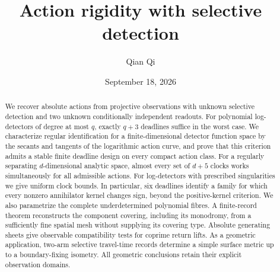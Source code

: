 \documentclass[11pt,reqno]{amsart}
\title[Action rigidity with selective detection]{Action rigidity with selective detection}
\author{Qian Qi}
\date{September 18, 2026}
\numberwithin{equation}{section}
\theoremstyle{definition}\newtheorem{definition}[theorem]{Definition}
\theoremstyle{remark}\newtheorem{remark}[theorem]{Remark}
\begin{document}
\begin{abstract}
We recover absolute actions from projective observations with unknown
selective detection and two unknown conditionally independent readouts.
For polynomial log-detectors of degree at most $q$, exactly $q+3$
deadlines suffice in the worst case. We characterize regular identification
for a finite-dimensional detector function space by the secants and
tangents of the logarithmic action curve, and prove that this criterion
admits a stable finite deadline design on every compact action class.
For a regularly separating $d$-dimensional analytic space, almost every
set of $d+5$ clocks works simultaneously for all admissible actions.
For log-detectors with prescribed singularities we give uniform clock
bounds. In particular, six deadlines identify a family for which every
nonzero annihilator kernel changes sign, beyond the positive-kernel
criterion. We also parametrize the complete underdetermined polynomial
fibres. A finite-record theorem reconstructs the component covering,
including its monodromy, from a sufficiently fine spatial mesh without
supplying its covering type. Absolute generating sheets give observable
compatibility tests for coprime return lifts. As a geometric application,
two-arm selective travel-time records determine a simple surface metric
up to a boundary-fixing isometry. All geometric conclusions retain their
explicit observation domains.
\end{abstract}
\maketitle
\setcounter{tocdepth}{1}
\tableofcontents
\end{document}
